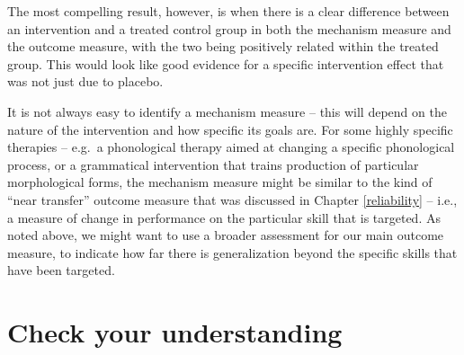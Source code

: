\documentclass{krantz}
\begin{document}
The most compelling result, however, is when there is a clear difference between an intervention and a treated control group in both the mechanism measure and the outcome measure, with the two being positively related within the treated group. This would look like good evidence for a specific intervention effect that was not just due to placebo.

It is not always easy to identify a mechanism measure -- this will depend on the nature of the intervention and how specific its goals are. For some highly specific therapies -- e.g.~a phonological therapy aimed at changing a specific phonological process, or a grammatical intervention that trains production of particular morphological forms, the mechanism measure might be similar to the kind of ``near transfer'' outcome measure that was discussed in Chapter \ref{reliability} -- i.e., a measure of change in performance on the particular skill that is targeted. As noted above, we might want to use a broader assessment for our main outcome measure, to indicate how far there is generalization beyond the specific skills that have been targeted.

\hypertarget{check-your-understanding-3}{%
\section{Check your understanding}\label{check-your-understanding-3}}
\end{document}

